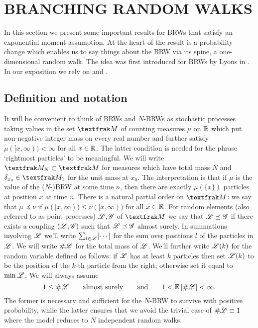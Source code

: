 \section{BRANCHING RANDOM WALKS}\label{sec:BRW_THEORY}

In this section we present some important results for BRWs that satisfy an exponential moment assumption. At the heart of the result is a probability change which enables us to say things about the BRW via its spine, a one-dimensional random walk. The idea was first introduced for BRWs by Lyons in \cite{lyons1997simple}. In our exposition we rely on \cite{mallein2018n} and \cite[Section 4.7]{shi2015branching}. 

\subsection{Definition and notation}
It will be convenient to think of BRWs and $N$-BRWs as stochastic processes taking values in the set $\frak{M}$ of counting measures $\mu$ on $\mathbb{R}$ which put non-negative integer mass on every real number and further satisfy $\mu([x, \infty)) < \infty$ for all $x \in \mathbb{R}$. The latter condition is needed for the phrase `rightmost particles' to be meaningful. We will write $\frak{M}_N \subset \frak{M}$ for measures which have total mass $N$ and $\delta_{x_0} \in \frak{M}_1$ for the unit mass at $x_0$. The interpretation is that if $\mu$ is the value of the ($N$-)BRW at some time $n$, then there are exactly $\mu(\{x\})$ particles at position $x$ at time $n$. There is a natural partial order on $\frak{M}$: we say that $\mu \preceq \nu$ if $\mu([x, \infty)) \leq \nu([x, \infty))$ for all $x \in \mathbb{R}$. For random elements (also referred to as point processes) $\mathscr{L}, \mathscr{G}$ of $\frak{M}$ we say that $\mathscr{L} \preceq \mathscr{G}$ if there exists a coupling $(\mathscr{L}, \mathscr{G})$ such that $\mathscr{L} \preceq \mathscr{G}$ almost surely. In summations involving $\mathscr{L}$ we'll write $\sum_{l \in \mathscr{L}} [\cdots]$ for the sum over positions $l$ of the particles in $\mathscr{L}$. We will write $\#\mathscr{L}$ for the total mass of $\mathscr{L}$. We'll further write $\mathscr{L}(k)$ for the random variable defined as follows: if $\mathscr{L}$ has at least $k$ particles then set $\mathscr{L}(k)$ to be the position of the $k$-th particle from the right; otherwise set it equal to $\min \mathscr{L}$. We will always assume 
\begin{equation}\label{eqn:TreeAssumptions}
1 \leq \# \mathscr{L} \qquad \text{almost surely} \qquad\text{and}\qquad 1 < \mathbb{E}\left[ \# \mathscr{L} \right] < \infty. 
\end{equation}
The former is necessary and sufficient for the $N$-BRW to survive with positive probability, while the latter ensures that we avoid the trivial case of $\# \mathscr{L} \equiv 1$ where the model reduces to $N$ independent random walks. \\

